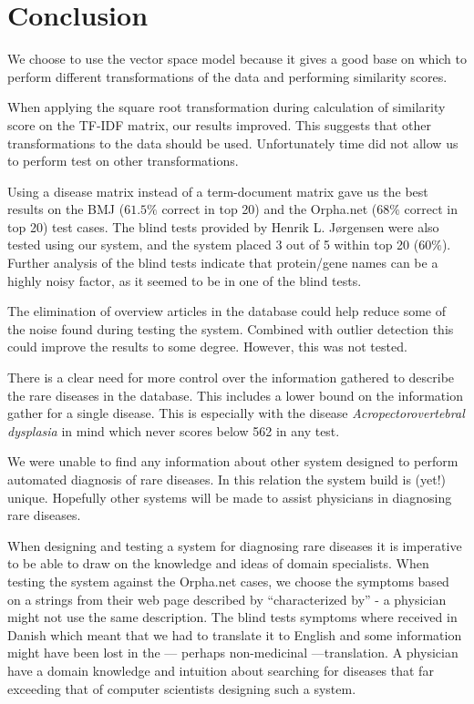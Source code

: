 \chapter{Conclusion\label{Conclusion}}

We choose to use the vector space model because it gives a good base
on which to perform different transformations of the data and performing
similarity scores.

When applying the square root transformation during calculation of
similarity score on the TF-IDF matrix, our results improved. This
suggests that other transformations to the data should be
used. Unfortunately time did not allow us to perform test on other
transformations.

Using a disease matrix instead of a term-document matrix gave us the best
results on the BMJ ($61.5\%$ correct in top 20) and the Orpha.net ($68\%$ correct in top 20) 
test cases. The blind tests provided by Henrik L. J\o rgensen were also tested
using our system, and the system placed 3 out of 5 within top
20 ($60\%$). Further analysis of the blind tests indicate that protein/gene names
can be a highly noisy factor, as it seemed to be in one of the blind
tests.

The elimination of overview articles in the database could help reduce
some of the noise found during testing the system. Combined with
outlier detection this could improve the results to some degree.
However, this was not tested.

There is a clear need for more control over the information gathered to
describe the rare diseases in the database. This includes a lower
bound on the information gather for a single disease. This is
especially with the disease \textit{Acropectorovertebral dysplasia} in mind which never
scores below 562 in any test.

We were unable to find any information about other system designed to
perform automated diagnosis of rare diseases. In this relation
the system build is (yet!) unique. Hopefully other systems will be
made to assist physicians in diagnosing rare diseases.

When designing and testing a system for diagnosing rare diseases it is
imperative to be able to draw on the knowledge and ideas of domain
specialists. When testing the system against the Orpha.net cases, we
choose the symptoms based on a strings from their web page described
by ``characterized by'' - a physician might not use the same
description. The blind tests symptoms where received in Danish which
meant that we had to translate it to English and some information
might have been lost in the --- perhaps non-medicinal ---translation. A physician have a domain
knowledge and intuition about searching for diseases that far exceeding
that of computer scientists designing such a system.

